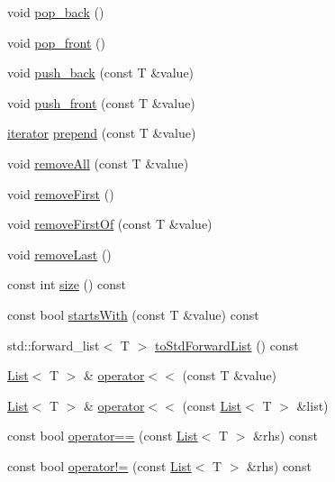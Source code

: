 \begin{DoxyCompactItemize}
\item 
void \hyperlink{classprism_1_1_list_aac8b29572cd691890a82846b35799e36}{pop\+\_\+back} ()
\item 
void \hyperlink{classprism_1_1_list_ab8a836a10bc37479fbbc458299d68569}{pop\+\_\+front} ()
\item 
void \hyperlink{classprism_1_1_list_aabc7020d0f04bc29412d2ff2cb632958}{push\+\_\+back} (const T \&value)
\item 
void \hyperlink{classprism_1_1_list_a9af267cdacc311662e39630da33f4431}{push\+\_\+front} (const T \&value)
\item 
\hyperlink{classprism_1_1_list_a6cf00c98a428ed325fe9ccc60d7ef95a}{iterator} \hyperlink{classprism_1_1_list_a01773efbec8bef23c7a37edb9ea7a93f}{prepend} (const T \&value)
\item 
void \hyperlink{classprism_1_1_list_a85937bf298db8c1c8f8017fff492b374}{remove\+All} (const T \&value)
\item 
void \hyperlink{classprism_1_1_list_a3e19c548f9f8205bea45d394ddcb9ccb}{remove\+First} ()
\item 
void \hyperlink{classprism_1_1_list_a8ee7eadb17120e6fa267278d0d58c13f}{remove\+First\+Of} (const T \&value)
\item 
void \hyperlink{classprism_1_1_list_ab6b68a4de2134c159b8e35a2f4bb935d}{remove\+Last} ()
\item 
const int \hyperlink{classprism_1_1_list_a90855d0c971c394fabf612c02dce4d3a}{size} () const 
\item 
const bool \hyperlink{classprism_1_1_list_ac129dafdb80ae13cfc914dc0668e6b39}{starts\+With} (const T \&value) const 
\item 
std\+::forward\+\_\+list$<$ T $>$ \hyperlink{classprism_1_1_list_ab628c77e4598e1055a8b832367a31997}{to\+Std\+Forward\+List} () const 
\item 
\hyperlink{classprism_1_1_list}{List}$<$ T $>$ \& \hyperlink{classprism_1_1_list_a86dfdf909c7151a54d231d15315acca1}{operator$<$$<$} (const T \&value)
\item 
\hyperlink{classprism_1_1_list}{List}$<$ T $>$ \& \hyperlink{classprism_1_1_list_aed7d35e45035b24e4a684f0b1c228086}{operator$<$$<$} (const \hyperlink{classprism_1_1_list}{List}$<$ T $>$ \&list)
\item 
const bool \hyperlink{classprism_1_1_list_a4c14c11fdcb43c27a1035fccbe0f7b4d}{operator==} (const \hyperlink{classprism_1_1_list}{List}$<$ T $>$ \&rhs) const 
\item 
const bool \hyperlink{classprism_1_1_list_a026cc068bceff4e74fd991e3940b76d7}{operator!=} (const \hyperlink{classprism_1_1_list}{List}$<$ T $>$ \&rhs) const 

\end{DoxyCompactItemize}
